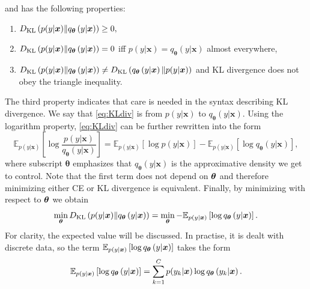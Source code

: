 and has the following properties:
\begin{enumerate}
\item $D_{\mathrm{KL}} \left(p(y| \boldsymbol{x}) \Vert q_{\boldsymbol{\theta}}\left(y|\boldsymbol{x}\right) \right) \geq 0,$
\item $D_{\mathrm{KL}} \left(p(y| \boldsymbol{x}) \Vert q_{\boldsymbol{\theta}}\left(y|\boldsymbol{x}\right) \right) = 0$ iff $p(y| \boldsymbol{x}) = q_{\boldsymbol{\theta}}\left(y|\boldsymbol{x}\right)$ almost everywhere,
\item $D_{\mathrm{KL}} \left(p(y| \boldsymbol{x}) \Vert q_{\boldsymbol{\theta}}\left(y|\boldsymbol{x}\right) \right) \neq D_{\mathrm{KL}} \left(q_{\boldsymbol{\theta}}\left(y|\boldsymbol{x}\right) \Vert p(y| \boldsymbol{x}) \right)$ and KL divergence does not obey the triangle inequality.
\end{enumerate}
The third property indicates that care is needed in the syntax describing KL divergence. We say that \eqref{eq:KLdiv} is from $p(y| \boldsymbol{x})$ to $q_{\boldsymbol{\theta}}\left(y|\boldsymbol{x}\right)$. Using the logarithm property, \eqref{eq:KLdiv} can be further rewritten into the form 
\begin{equation}
	 \mathbb{E}_{p(y| \boldsymbol{x})} \left[\log\frac{p(y| \boldsymbol{x})}{q_{\boldsymbol{\theta}}\left(y|\boldsymbol{x}\right)} \right] = 
	 \mathbb{E}_{p(y| \boldsymbol{x})} \left[\log p(y| \boldsymbol{x}) \right] - \mathbb{E}_{p(y| \boldsymbol{x})} \left[\log q_{\boldsymbol{\theta}}\left(y|\boldsymbol{x}\right) \right],
	\end{equation}
where subscript $\boldsymbol{\theta}$ emphasizes that $q_{\boldsymbol{\theta}}\left(y|\boldsymbol{x}\right)$ is the approximative density we get to control. Note that
the first term does not depend on $\boldsymbol{\theta}$ and therefore minimizing either CE or KL divergence is equivalent. Finally, by minimizing with respect to $\boldsymbol{\theta}$ we obtain
\begin{equation}
\min_{\boldsymbol{\theta}} D_{\mathrm{KL}} \left(p(y| \boldsymbol{x}) \Vert q_{\boldsymbol{\theta}}\left(y|\boldsymbol{x}\right) \right) = \min_{\boldsymbol{\theta}} - \mathbb{E}_{p(y| \boldsymbol{x})}\left[ \log q_{\boldsymbol{\theta}}\left(y|\boldsymbol{x}\right)\right].
\end{equation}
For clarity, the expected value will be discussed. In practise, it is dealt with discrete data, so the term  $\mathbb{E}_{ p(y| \boldsymbol{x})}\left[\log q_{\boldsymbol{\theta}}\left(y|\boldsymbol{x}\right)\right]$ takes the form
\begin{equation}
    \mathbb{E}_{p(y| \boldsymbol{x})}\left[\log q_{\boldsymbol{\theta}}\left(y|\boldsymbol{x}\right)\right] = \sum_{k=1}^C p(y_k| \boldsymbol{x})\log q_{\boldsymbol{\theta}}\left(y_k|\boldsymbol{x}\right).
\end{equation}
